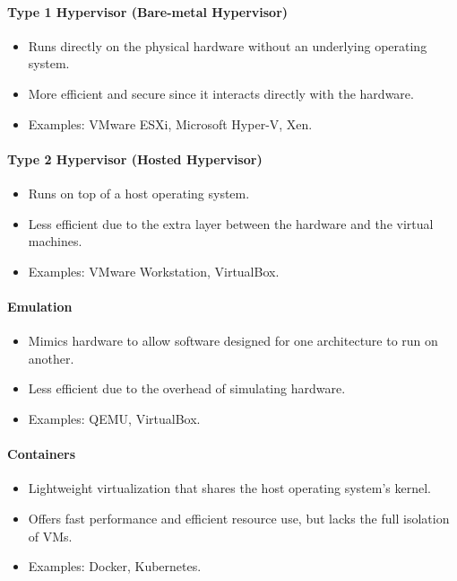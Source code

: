 \documentclass{article}
\begin{document}
\paragraph{Type 1 Hypervisor (Bare-metal Hypervisor)}
\begin{itemize}
    \item Runs directly on the physical hardware without an underlying operating system.
    \item More efficient and secure since it interacts directly with the hardware.
    \item Examples: VMware ESXi, Microsoft Hyper-V, Xen.
\end{itemize}

\paragraph{Type 2 Hypervisor (Hosted Hypervisor)}
\begin{itemize}
    \item Runs on top of a host operating system.
    \item Less efficient due to the extra layer between the hardware and the virtual machines.
    \item Examples: VMware Workstation, VirtualBox.
\end{itemize}

\paragraph{Emulation}
\begin{itemize}
    \item Mimics hardware to allow software designed for one architecture to run on another.
    \item Less efficient due to the overhead of simulating hardware.
    \item Examples: QEMU, VirtualBox.
\end{itemize}

\paragraph{Containers}
\begin{itemize}
    \item Lightweight virtualization that shares the host operating system's kernel.
    \item Offers fast performance and efficient resource use, but lacks the full isolation of VMs.
    \item Examples: Docker, Kubernetes.
\end{itemize}




\end{document}
